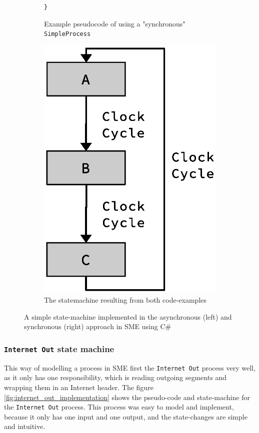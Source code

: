 \begin{figure}
\begin{subfigure}[b]{0.3\textwidth}
\begin{lstlisting}[language={[Sharp]C}]
}
\end{lstlisting}
	\caption{Example pseudocode of using a "synchronous" \texttt{SimpleProcess}}
	\label{fig:sme_example_process_sync_code}
    \end{subfigure}
\hfill
 \begin{subfigure}[b]{0.3\textwidth}
        \centering
        \includegraphics[scale=0.45]{implementation/empty_process_fsm.eps}
        \caption{The statemachine resulting from both code-examples}
 	\label{fig:sme_example_process_fsm}
\end{subfigure}
    \caption{A simple state-machine implemented in the asynchronous (left) and
synchronous (right) approach in SME using C\#}
    \label{fig:example_fsm}
\end{figure}


\subsubsection{\texttt{Internet Out} state machine}
This way of modelling a process in SME first the \texttt{Internet Out} process
very well, as it only has one responsibility, which is reading outgoing segments
and wrapping them in an Internet header. The figure \ref{fig:internet_out_implementation} shows the pseudo-code and state-machine for the \texttt{Internet Out}
process. This process was easy to model and implement, because it only has one
input and one output, and the state-changes are simple and intuitive.

